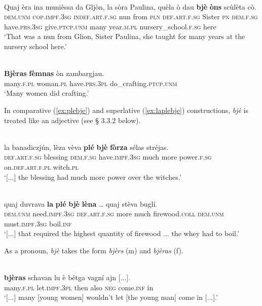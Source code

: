 \ea
\label{}
\\
\gll Quaj èra ina munièssa da Gljòn, la sòra Paulina, quèla ò dau \textbf{bjè} \textbf{òns} scùlèta cò.\\
\textsc{dem.unm} \textsc{cop.impf.3sg} \textsc{indef.art.f.sg} nun from \textsc{pln} \textsc{def.art.f.sg} Sister \textsc{pn} \textsc{dem.f.sg}  have.\textsc{prs.3sg} give.\textsc{ptcp.unm} many year.\textsc{m.pl} nursery\_school.\textsc{f.sg} here\\
\glt `That was a nun from Glion, Sister Paulina, she taught for many years at the nursery school here.'
\z

\ea
\label{}
\\
\gll \textbf{Bjèras} \textbf{fèmnas} òn zambargjau.\\
many.\textsc{f.pl} woman.\textsc{pl} have.\textsc{prs.3pl} do\_crafting.\textsc{ptcp.unm}\\
\glt `Many women did crafting.'
\z

In comparative (\ref{ex:plebje}) and superlative (\ref{ex:laplebje}) constructions, \textit{bjè} is treated like an adjective (see § 3.3.2 below). 

\ea
\label{ex:plebje}
\\
	\gll [...] la banadiczjún, lèza vèva \textbf{plé} \textbf{bjè} \textbf{fòrza} sélas stréjas.\\
{} \textsc{def.art.f.sg} blessing \textsc{dem.f.sg} have.\textsc{impf.3sg} much more power.\textsc{f.sg} on.\textsc{def.art.f.pl} witch.\textsc{pl}\\
\glt `[...] the blessing had much more power over the witches.'
\z

\ea
\label{ex:laplebje}
\\
\gll [...] quaj duvrava \textbf{la} \textbf{plé} \textbf{bjè} \textbf{lèna} … quaj stèva buglí.  \\
{} \textsc{dem.unm} need.\textsc{impf.3sg} \textsc{def.art.f.sg} more much firewood.\textsc{coll} {} \textsc{dem.unm} must.\textsc{impf.3sg} boil.\textsc{inf}\\
\glt `[...] that required the highest quantity of firewood ... the whey had to boil.'
\z

As a pronoun, \textit{bjè} takes the form \textit{bjèrs} (m) and \textit{bjèras} (f).

\ea
\label{}
\\
	\gll    [...] \textbf{bjèras} schavan lu è bétga vagní ajn [...].\\
{} many.\textsc{f.pl} let.\textsc{impf.3pl} then also \textsc{neg} come.\textsc{inf} in\\
\glt `[...] many [young women] wouldn’t let [the young man] come in [...].'
\z

